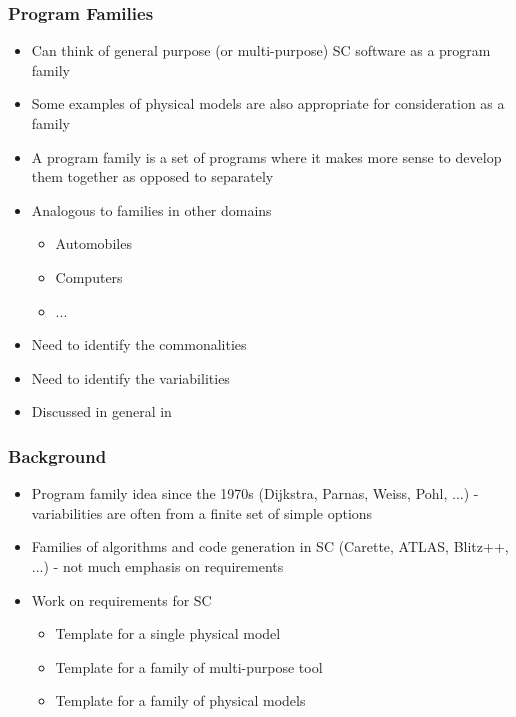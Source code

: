 \documentclass[t,12pt,numbers,fleqn]{beamer}
\begin{document}
\begin{frame}
\frametitle{Program Families}

\begin{itemize}

\item Can think of general purpose (or multi-purpose) SC software as a program
  family
\item Some examples of physical models are also appropriate for consideration as
  a family
\item A program family is a set of programs where it makes more sense to develop
  them together as opposed to separately
\item Analogous to families in other domains
\begin{itemize}
\item Automobiles
\item Computers
\item ...
\end{itemize}
\item Need to identify the commonalities
\item Need to identify the variabilities
\item Discussed in general in \cite{ClementsAndNorthrop2001,PohlEtAl2005}
\end{itemize}

\end{frame}


\begin{frame}
\frametitle{Background}

\begin{itemize}

\item Program family idea since the 1970s (Dijkstra, Parnas, Weiss, Pohl, ...) - variabilities are often from a finite
set of simple options \cite{Parnas1976, Parnas1979, Dijkstra1972}
\item Families of algorithms and code generation in SC (Carette, ATLAS, Blitz++, ...) - not much emphasis on
requirements \cite{Carette2006, WhaleyEtAl2001, Veldhuizen1998, Blitz2010}
\item Work on requirements for SC
\begin{itemize}
\item Template for a single physical model \cite{SmithEtAl2007, SmithAndLai2005}
\item Template for a family of multi-purpose tool \cite{Smith2006,
    SmithAndChen2004, SmithAndChen2004b}
\item Template for a family of physical models
  \cite{SmithMcCutchanAndCarette2017, SmithEtAl2008, McCutchan2007}
\end{itemize}
\end{itemize}

\end{frame}
\end{document}
